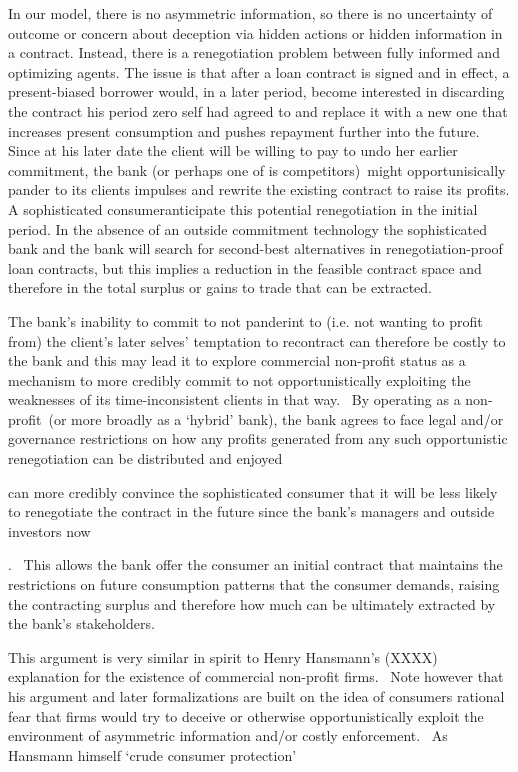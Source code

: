 \documentclass[11pt]{article}%
\begin{document}
In our model, there is no asymmetric information, so there is no uncertainty
of outcome or concern about deception via hidden actions or hidden information
in a contract. Instead, there is a renegotiation problem between fully
informed and optimizing agents. The issue is that after a loan contract is
signed and in effect, a present-biased borrower would, in a later period,
become interested in discarding the contract his period zero self had agreed
to and replace it with a new one that increases present consumption and pushes
repayment further into the future. Since at his later date the client will be
willing to pay to undo her earlier commitment, the bank (or perhaps one of is
competitors)\ might opportunisically pander to its clients impulses and
rewrite the existing contract to raise its profits. A sophisticated
consumeranticipate this potential renegotiation in the initial period. In the
absence of an outside commitment technology the sophisticated bank and the
bank will search for second-best alternatives in renegotiation-proof loan
contracts, but this implies a reduction in the feasible contract space and
therefore in the total surplus or gains to trade that can be extracted. \ 

The bank's inability to commit to not panderint to (i.e. not wanting to profit
from) the client's later selves' temptation to recontract can therefore be
costly to the bank and this may lead it to explore commercial non-profit
status as a mechanism to more credibly commit to not opportunistically
exploiting the weaknesses of its time-inconsistent clients in that way. \ By
operating as a non-profit\ (or more broadly as a `hybrid' bank), the bank
agrees to face legal and/or governance restrictions on how any profits
generated from any such opportunistic renegotiation can be distributed and enjoyed

can more credibly convince the sophisticated consumer that it will be less
likely to renegotiate the contract in the future since the bank's managers and
outside investors now

. \ This allows the bank offer the consumer an initial contract that maintains
the restrictions on future consumption patterns that the consumer demands,
raising the contracting surplus and therefore how much can be ultimately
extracted by the bank's stakeholders. \ 

This argument is very similar in spirit to Henry Hansmann's (XXXX) explanation
for the existence of commercial non-profit firms. \ Note however that his
argument and later formalizations are built on the idea of consumers rational
fear that firms would try to deceive or otherwise opportunistically exploit
the environment of asymmetric information and/or costly enforcement. \ As
Hansmann himself `crude consumer protection'
\end{document}

